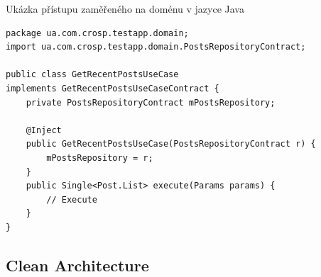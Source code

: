 \begin{listing}
    \caption{Ukázka přístupu zaměřeného na doménu v jazyce Java~\cite{architecture}}
    \label{code:architecture-domain}
    \begin{verbatim}
package ua.com.crosp.testapp.domain;
import ua.com.crosp.testapp.domain.PostsRepositoryContract;

public class GetRecentPostsUseCase
implements GetRecentPostsUseCaseContract {
    private PostsRepositoryContract mPostsRepository;

    @Inject
    public GetRecentPostsUseCase(PostsRepositoryContract r) {
        mPostsRepository = r;
    }
    public Single<Post.List> execute(Params params) {
        // Execute
    }
}
    \end{verbatim}
\end{listing}

\subsection{Clean Architecture}


~\cite{martin_clean_architecture}


 







